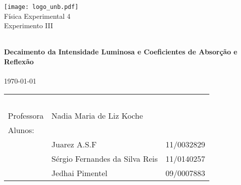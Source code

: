 \begin{titlepage}
\begin{center}

\texttt{[image: logo\_unb.pdf]}~\\[1cm]

\Huge Física Experimental 4\\[0.5cm]

\huge Experimento III

\HRule \\[0.4cm]
{ \huge \bfseries  Decaimento da Intensidade Luminosa e Coeficientes de Absorção e Reflexão}\\[0.4cm]

\HRule \\[0.5cm]

{\large \today}


\vfill %



	\begin{center} \large
		\begin{tabular}{llr} \
		& & \\[0.05cm]		
		Professora & Nadia Maria de Liz Koche & \\
		
		Alunos:& & \\
		& Juarez A.S.F 					& 11/0032829\\
		& Sérgio Fernandes da Silva Reis & 11/0140257\\
		& Jedhai Pimentel				& 09/0007883\\	[0.05cm]	
		\end{tabular}

	
	\end{center}


\end{center}
\end{titlepage}